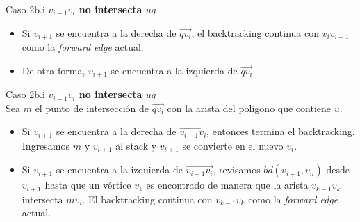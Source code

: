 \documentclass[aspectratio=169,xcolor=dvipsnames, t]{beamer}
\begin{document}

\begin{frame}{Caso 2b.i}
    \textbf{$v_{i-1}v_{i}$ no intersecta $uq$}\\ 
    \begin{itemize}
        \item Si $v_{i+1}$ se encuentra a la derecha de $\overrightarrow{qv_{i}}$, el backtracking continua con $v_{i}v_{i+1}$ como la \textit{forward edge} actual.  
        \item De otra forma, $v_{i+1}$ se encuentra a la izquierda de $\overrightarrow{qv_{i}}.$
    \end{itemize}
\end{frame}


\begin{frame}{Caso 2b.i}
    \textbf{$v_{i-1}v_{i}$ no intersecta $uq$}\\ 
        Sea $m$ el punto de intersección de $\overrightarrow{qv_{i}}$ con la arista del polígono que contiene $u$. 
        \begin{itemize}
            \item Si $v_{i+1}$ se encuentra a la derecha de $\overrightarrow{v_{i-1}v_{i}}$, entonces termina el backtracking. Ingresamos $m$ y $v_{i+1}$ al stack y $v_{i+1}$ se convierte en el nuevo $v_{i}$.
            \item Si $v_{i+1}$ se encuentra a la izquierda de $\overrightarrow{v_{i-1}v_{i}}$, revisamos $bd(v_{i+1}, v_{n})$ desde $v_{i+1}$ hasta que un vértice $v_{k}$ es encontrado de manera que la arista $v_{k-1}v_{k}$ intersecta $mv_{i}$. El backtracking continua con $v_{k-1}v_{k}$ como la \textit{forward edge} actual.
        \end{itemize}
\end{frame}
\end{document}
